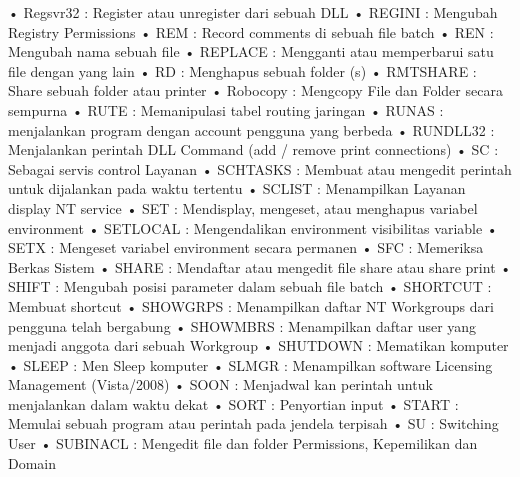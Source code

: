 \documentclass{article}
\begin{document}
• Regsvr32 : Register atau unregister dari sebuah DLL
• REGINI : Mengubah Registry Permissions
• REM : Record comments di sebuah file batch
• REN : Mengubah nama sebuah file
• REPLACE : Mengganti atau memperbarui satu file dengan yang lain
• RD : Menghapus sebuah folder (s)
• RMTSHARE : Share sebuah folder atau printer
• Robocopy : Mengcopy File dan Folder secara sempurna
• RUTE : Memanipulasi tabel routing jaringan
• RUNAS : menjalankan program dengan account pengguna yang berbeda
• RUNDLL32 : Menjalankan perintah DLL Command (add / remove print connections)
• SC : Sebagai servis control Layanan
• SCHTASKS : Membuat atau mengedit perintah untuk dijalankan pada waktu tertentu
• SCLIST : Menampilkan Layanan display NT service
• SET : Mendisplay, mengeset, atau menghapus variabel environment
• SETLOCAL : Mengendalikan environment visibilitas variable
• SETX : Mengeset variabel environment secara permanen
• SFC : Memeriksa Berkas Sistem
• SHARE :  Mendaftar atau mengedit file share atau share print
• SHIFT : Mengubah posisi parameter dalam sebuah file batch
• SHORTCUT : Membuat shortcut
• SHOWGRPS : Menampilkan daftar NT Workgroups dari  pengguna telah bergabung
• SHOWMBRS : Menampilkan daftar user yang menjadi anggota dari sebuah Workgroup
• SHUTDOWN : Mematikan komputer
• SLEEP : Men Sleep komputer
• SLMGR : Menampilkan software Licensing Management (Vista/2008)
• SOON : Menjadwal kan perintah untuk menjalankan dalam waktu dekat
• SORT : Penyortian input
• START : Memulai sebuah program atau perintah pada jendela terpisah
• SU : Switching User
• SUBINACL : Mengedit file dan folder Permissions, Kepemilikan dan Domain 
\end{document}
